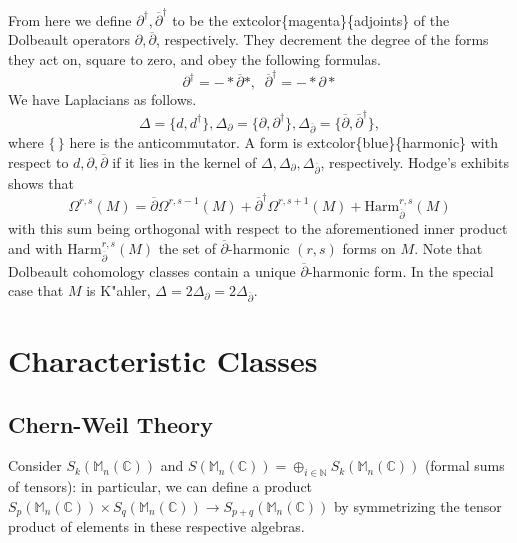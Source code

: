 \documentclass[
]{book}
\begin{document}
From here we define \(\partial^\dagger, \overline{\partial}^{\dagger}\) to be the extcolor\{magenta\}\{adjoints\} of the Dolbeault operators \(\partial, \overline{\partial}\), respectively.
They decrement the degree of the forms they act on, square to zero, and obey the following formulas.
\begin{equation}
    \partial^\dagger = - \ast \overline{\partial} \ast, \;\; \overline{\partial}^\dagger = - \ast \partial \ast 
\end{equation}
We have Laplacians as follows.
\begin{equation} 
    \Delta = \{d, d^\dagger\}, \Delta_\partial = \{\partial, \partial^\dagger\}, \Delta_{\overline{\partial}} = \{\overline{\partial}, \overline{\partial}^\dagger\},  
\end{equation}
where \(\{ \, \}\) here is the anticommutator.
A form is extcolor\{blue\}\{harmonic\} with respect to \(d, \partial, \overline{\partial}\) if it lies in the kernel of \(\Delta, \Delta_\partial, \Delta_{\overline{\partial}}\), respectively.
Hodge's exhibits shows that
\begin{equation} 
    \Omega^{r,s}(M) = \overline{\partial} \Omega^{r,s-1}(M) + \overline{\partial}^\dagger         \Omega^{r,s+1}(M) + \text{Harm}_{\overline{\partial}}^{r,s}(M) 
\end{equation}
with this sum being orthogonal with respect to the aforementioned inner product and with \(\text{Harm}_{\overline{\partial}}^{r,s}(M)\) the set of \(\overline{\partial}\)-harmonic \((r,s)\) forms on \(M\).
Note that Dolbeault cohomology classes contain a unique \(\overline{\partial}\)-harmonic form.
In the special case that \(M\) is K"ahler, \(\Delta = 2\Delta_\partial = 2\Delta_{\overline{\partial}}\).

\hypertarget{characteristic-classes}{%
\chapter{Characteristic Classes}\label{characteristic-classes}}

\hypertarget{chern-weil-theory}{%
\section{Chern-Weil Theory}\label{chern-weil-theory}}

Consider \(S_k(\mathbb{M}_n(\mathbb{C}))\) and \(S(\mathbb{M}_n(\mathbb{C})) = \oplus_{i \in \mathbb{N}} S_k(\mathbb{M}_n(\mathbb{C}))\) (formal sums of tensors): in particular, we can define a product \(S_p(\mathbb{M}_n(\mathbb{C})) \times S_q(\mathbb{M}_n(\mathbb{C})) \to S_{p+q}(\mathbb{M}_n(\mathbb{C}))\) by symmetrizing the tensor product of elements in these respective algebras.
\end{document}
